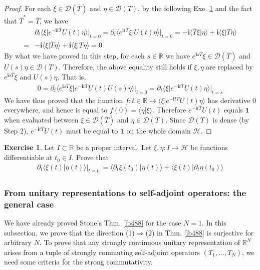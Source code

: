 \documentclass[12pt,b5paper,notitlepage]{article}
\theoremstyle{definition}
\newtheorem{exe}[df]{Exercise}
\theoremstyle{plain}
\newcommand{\ovl}{\overline}
\newcommand{\idt}{\mathbf{1}}
\newcommand{\Dom}{\mathscr{D}}
\newcommand{\bk}[1]{\langle {#1}\rangle}
\newcommand{\im}{\mathbf{i}}
\newcommand{\Rbb}{\mathbb R}
\newcommand{\MH}{\mathcal H}
\numberwithin{equation}{section}
\begin{document}
\begin{proof}
For each $\xi\in\Dom(\ovl T)$ and $\eta\in\Dom(T)$, by the following Exe. \ref{lb501} and the fact that $\ovl T^*=\ovl T$, we have
\begin{align*}
&\partial_t\bk{\xi|e^{-\im t\ovl T}U(t)\eta}\big|_{t=0}=\partial_t\bk{e^{\im t\ovl T}\xi|U(t)\eta}\big|_{t=0}=-\im\bk{\ovl T\xi|\eta}+\im\bk{\xi|T\eta}\\
=&-\im\bk{\xi|\ovl T\eta}+\im\bk{\xi|T\eta}=0
\end{align*}
By what we have proved in this step, for each $s\in\Rbb$ we have $e^{\im s\ovl T}\xi\in\Dom(\ovl T)$ and $U(s)\eta\in\Dom(T)$. Therefore, the above equality still holds if $\xi,\eta$ are replaced by $e^{\im s\ovl T}\xi$ and $U(s)\eta$. That is,
\begin{align*}
0=\partial_t\bk{e^{\im s\ovl T}\xi|e^{-\im t\ovl T}U(t)U(s)\eta}\big|_{t=0}=\partial_t\bk{\xi|e^{-\im t\ovl T}U(t)\eta}\big|_{t=s}
\end{align*}
We have thus proved that the function $f:t\in\Rbb\mapsto \bk{\xi|e^{-\im t\ovl T}U(t)\eta}$ has derivative $0$ everywhere, and hence is equal to $f(0)=\bk{\eta|\xi}$. Therefore $e^{-\im t\ovl T}U(t)$ equals $\idt$ when evaluated between $\xi\in\Dom(\ovl T)$ and $\eta\in\Dom(T)$. Since $\Dom(T)$ is dense (by Step 2), $e^{-\im t\ovl T}U(t)$ must be equal to $\idt$ on the whole domain $\MH$.
\end{proof}



\begin{exe}\label{lb501}
Let $I\subset\Rbb$ be a proper interval. Let $\xi,\eta:I\rightarrow\MH$ be functions differentiable at $t_0\in I$. Prove that
\begin{align*}
\partial_t\bk{\xi(t)|\eta(t)}\big|_{t=t_0}=\bk{\partial_t\xi(t_0)|\eta(t)}+\bk{\xi(t)|\partial_t\eta(t_0)}
\end{align*}
\end{exe}

\subsubsection{From unitary representations to self-adjoint operators: the general case}\label{lb504}

We have already proved Stone's Thm. \ref{lb488} for the case $N=1$. In this subsection, we prove that the direction (1)$\Rightarrow$(2) in Thm. \ref{lb488} is surjective for arbitrary $N$. To prove that any strongly continuous unitary representation of $\Rbb^N$ arises from a tuple of strongly commuting self-adjoint operators $(T_1,\dots,T_N)$, we need some criteria for the strong commutativity. 
\end{document}
